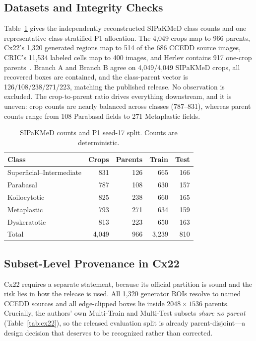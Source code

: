 \documentclass[conference]{IEEEtran}
\newcommand{\protocol}[1]{\textsf{#1}}
\begin{document}
\subsection{Datasets and Integrity Checks}
Table~\ref{tab:classes} gives the independently reconstructed SIPaKMeD class counts and one representative class-stratified \protocol{P1} allocation.
The 4,049 crops map to 966 parents, Cx22's 1,320 generated regions map to 514 of the 686 CCEDD source images, CRIC's 11,534 labeled cells map to 400 images, and Herlev contains 917 one-crop parents~\cite{plissiti2018sipakmed,liu2022cx22,rezende2021cric,jantzen2005pap}.
Branch A and Branch B agree on 4,049/4,049 SIPaKMeD crops, all recovered boxes are contained, and the class-parent vector is 126/108/238/271/223, matching the published release.
No observation is excluded.
The crop-to-parent ratio drives everything downstream, and it is uneven: crop counts are nearly balanced across classes (787--831), whereas parent counts range from 108 Parabasal fields to 271 Metaplastic fields.

\begin{table}[t]
\caption{SIPaKMeD counts and \protocol{P1} seed-17 split. Counts are deterministic.}
\label{tab:classes}
\centering
\scriptsize
\setlength{\tabcolsep}{4.0pt}
\begin{tabular}{lrrrr}
\toprule
Class & Crops & Parents & Train & Test \\
\midrule
Superficial--Intermediate & 831 & 126 & 665 & 166 \\
Parabasal & 787 & 108 & 630 & 157 \\
Koilocytotic & 825 & 238 & 660 & 165 \\
Metaplastic & 793 & 271 & 634 & 159 \\
Dyskeratotic & 813 & 223 & 650 & 163 \\
\midrule
Total & 4,049 & 966 & 3,239 & 810 \\
\bottomrule
\end{tabular}
\end{table}

\subsection{Subset-Level Provenance in Cx22}
Cx22 requires a separate statement, because its official partition is sound and the risk lies in how the release is used.
All 1,320 generator ROIs resolve to named CCEDD sources and all edge-clipped boxes lie inside $2048\times1536$ parents.
Crucially, the authors' own Multi-Train and Multi-Test subsets \emph{share no parent} (Table~\ref{tab:cx22}), so the released evaluation split is already parent-disjoint---a design decision that deserves to be recognized rather than corrected.
\end{document}
